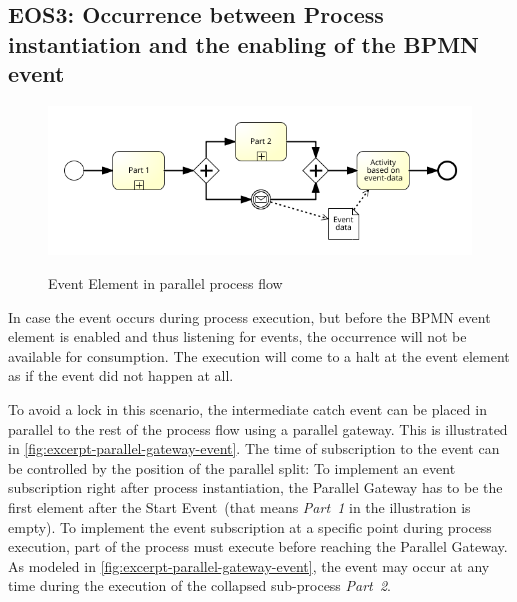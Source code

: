 \subsection*{EOS3: Occurrence between Process instantiation and the enabling of the BPMN event}
\begin{figure}[]
	\myfloatalign
	{\includegraphics[width=1\linewidth]{chapters/assessment/parallel-gateway-early-subscription.png}}
	\caption{Event Element in parallel process flow}\label{fig:excerpt-parallel-gateway-event}
\end{figure}

In case the event occurs during process execution, but before the BPMN event element is enabled and thus listening for events, the occurrence will not be available for consumption. 
The execution will come to a halt at the event element as if the event did not happen at all.


To avoid a lock in this scenario, the intermediate catch event can be placed in parallel to the rest of the process flow using a parallel gateway. 
This is illustrated in \autoref{fig:excerpt-parallel-gateway-event}. The time of subscription to the event can be controlled by the position of the parallel split: To implement an event subscription right after process instantiation, the Parallel Gateway has to be the first element after the Start Event~(that means \textit{Part~1} in the illustration is empty). 
To implement the event subscription at a specific point during process execution, part of the process must execute before reaching the Parallel Gateway. As modeled in \autoref{fig:excerpt-parallel-gateway-event}, the event may occur at any time during the execution of the collapsed sub-process \textit{Part~2}. 

